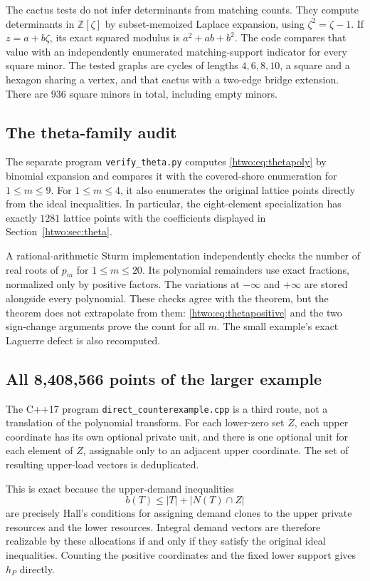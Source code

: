\documentclass[11pt]{article}
\numberwithin{equation}{section}
\theoremstyle{definition}
\newcommand{\Z}{\mathbb Z}
\begin{document}
The cactus tests do not infer determinants from matching counts. They
compute determinants in $\Z[\zeta]$ by subset-memoized Laplace expansion,
using $\zeta^2=\zeta-1$. If $z=a+b\zeta$, its exact squared modulus is
$a^2+ab+b^2$. The code compares that value with an independently enumerated
matching-support indicator for every square minor. The tested graphs
are cycles of lengths $4,6,8,10$, a square and a hexagon sharing a vertex,
and that cactus with a two-edge bridge extension. There are $936$
square minors in total, including empty minors.

\subsection{The theta-family audit}

The separate program \texttt{verify\_theta.py} computes
\eqref{htwo:eq:thetapoly} by binomial expansion and compares it with the
covered-shore enumeration for $1\le m\le9$. For $1\le m\le4$, it also
enumerates the original lattice points directly from the ideal
inequalities. In particular, the eight-element specialization has exactly
$1281$ lattice points with the coefficients displayed in
Section~\ref{htwo:sec:theta}.

A rational-arithmetic Sturm implementation independently checks the
number of real roots of $p_m$ for $1\le m\le20$. Its polynomial remainders
use exact fractions, normalized only by positive factors. The variations
at $-\infty$ and $+\infty$ are stored alongside every polynomial. These
checks agree with the theorem, but the theorem does not extrapolate from
them: \eqref{htwo:eq:thetapositive} and the two sign-change arguments prove the
count for all $m$. The small example's exact Laguerre defect is also
recomputed.

\subsection{All 8,408,566 points of the larger example}

The C++17 program \texttt{direct\_counterexample.cpp} is a third
route, not a translation of the polynomial transform. For each lower-zero
set $Z$, each upper coordinate has its own optional private unit, and
there is one optional unit for each element of $Z$, assignable only to
an adjacent upper coordinate. The set of resulting upper-load vectors
is deduplicated.

This is exact because the upper-demand inequalities
\[
 b(T)\le |T|+|N(T)\cap Z|
\]
are precisely Hall's conditions for assigning demand clones to the upper
private resources and the lower resources. Integral demand vectors are
therefore realizable by these allocations if and only if they satisfy
the original ideal inequalities. Counting the positive coordinates and
the fixed lower support gives $h_P$ directly.
\end{document}
